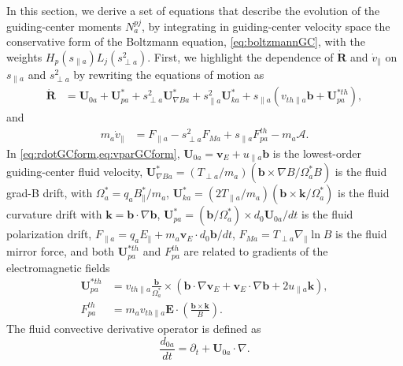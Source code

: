 {{In this section, we derive a set of equations that describe the evolution of  the guiding-center moments $N_a^{pj}$, by integrating in guiding-center velocity space the conservative form of the Boltzmann equation, \cref{eq:boltzmannGC}, with the weights $H_p(s_{\parallel a})L_j(s_{\perp a}^2)$.
First, we highlight the dependence of $\dot{\mathbf R}$ and $\dot v_{\parallel}$ on $s_{\parallel a}$ and $s_{\perp a}^2$ by rewriting the equations of motion as
%
\begin{equation}
\begin{split}
    \dot{\mathbf R} &= \mathbf U_{0 a} + \mathbf U_{p a}^* + s_{\perp a}^2 \mathbf U_{\nabla B a}^* + s_{\parallel a}^2 \mathbf U_{k a}^* + s_{\parallel a}(v_{th\parallel a} \mathbf b + \mathbf U_{p a}^{*th}),
\end{split}
\label{eq:rdotGCform}
\end{equation}
%
and
%
\begin{equation}
\begin{split}
    m_a \dot{v}_\parallel &= F_{\parallel a}-s_{\perp a}^2 F_{M a} +s_{\parallel a} F_{p a}^{th}-m_a \mathcal{A}.
\end{split}
\label{eq:vparGCform}
\end{equation}
%
In \cref{eq:rdotGCform,eq:vparGCform}, $\mathbf U_{0 a} = \mathbf v_E + u_{\parallel a} \mathbf b$ is the lowest-order guiding-center fluid velocity, $\mathbf U_{\nabla B a}^* = (T_{\perp a}/m_a)(\mathbf b \times \nabla B/\Omega_a^{*} B)$ is the fluid grad-B drift, with $\Omega_a^{*} = q_a B_{\parallel}^* / m_a$, $\mathbf U_{ka}^{*} = (2 T_{\parallel a}/m_a)(\mathbf b \times \mathbf k/\Omega_a^*)$ is the fluid curvature drift with $\mathbf k = \mathbf b \cdot \nabla \mathbf b$, $\mathbf U_{pa}^* = ({\mathbf b}/{\Omega_a^*})\times d_0 \mathbf U_{0 a}/dt$ is the fluid polarization drift, $F_{\parallel a} = q_a E_\parallel+m_a\mathbf v_E \cdot d_0 \mathbf b/{dt}$, $F_{M a} = {T_{\perp a}}{}\nabla_\parallel \ln B$ is the fluid mirror force, and both $\mathbf U_{p a}^{*th}$ and $F_{p a}^{th}$ are related to gradients of the electromagnetic fields
%
\begin{equation}
\begin{split}
    \mathbf U_{p a}^{*th} &= v_{th\parallel a}\frac{\mathbf b}{\Omega_a^*}\times \left(\mathbf b \cdot \nabla \mathbf v_E+\mathbf v_E \cdot \nabla \mathbf b + 2 u_{\parallel a} \mathbf k\right),\\
    F_{p a}^{th} &=  m_a v_{th\parallel a} \mathbf E \cdot \left(\frac{\mathbf b \times \mathbf k}{B}\right).
\end{split}
\end{equation}
%
The fluid convective derivative operator is defined as 
%
\begin{equation}
    \frac{d_{0 a}}{dt} = \partial_t + \mathbf U_{0 a} \cdot \nabla.  
    \label{eq:convdev0}
\end{equation}

}}

